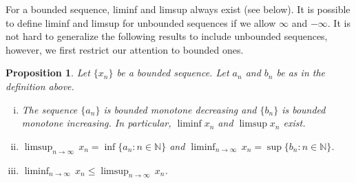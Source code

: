\documentclass[12pt]{book}
\newcommand{\N}{{\mathbb{N}}}
\theoremstyle{plain}
\newtheorem{prop}[thm]{Proposition}
\theoremstyle{remark}
\theoremstyle{definition}
\theoremstyle{exercise}
\theoremstyle{example}
\begin{document}
For a bounded sequence, liminf and limsup always exist (see below).  It is possible
to define liminf and limsup for unbounded sequences if we allow $\infty$
and $-\infty$.  It is not hard to generalize the following results to
include unbounded sequences, however, we first restrict our attention to
bounded ones.

\begin{prop}
Let $\{ x_n \}$ be a bounded sequence.  Let $a_n$ and $b_n$ be as in
the definition above.
\begin{enumerate}[(i)]
\item
The
sequence $\{ a_n \}$ is bounded monotone decreasing
and $\{ b_n \}$ is bounded monotone increasing.  In particular,
$\liminf x_n$ and $\limsup x_n$ exist.
\item
$\displaystyle \limsup_{n \to \infty} \, x_n = \inf \{ a_n : n \in \N \}$
and
$\displaystyle \liminf_{n \to \infty} \, x_n = \sup \{ b_n : n \in \N \}$.
\item
$\displaystyle \liminf_{n \to \infty} \, x_n \leq
\limsup_{n \to \infty} \, x_n$.
\end{enumerate}
\end{prop}
\end{document}
